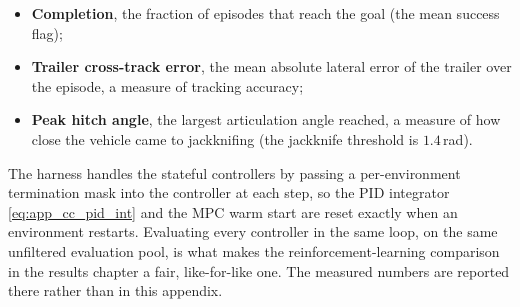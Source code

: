 \begin{itemize}
    \item \textbf{Completion}, the fraction of episodes that reach the goal
    (the mean success flag);
    \item \textbf{Trailer cross-track error}, the mean absolute lateral error of the
    trailer over the episode, a measure of tracking accuracy;
    \item \textbf{Peak hitch angle}, the largest articulation angle reached, a measure
    of how close the vehicle came to jackknifing (the jackknife threshold is
    $1.4$\,rad).
\end{itemize}

The harness handles the stateful controllers by passing a per-environment termination mask
into the controller at each step, so the PID integrator \eqref{eq:app_cc_pid_int} and the
MPC warm start are reset exactly when an environment restarts. Evaluating every controller
in the same loop, on the same unfiltered evaluation pool, is what makes the reinforcement-learning
comparison in the results chapter a fair, like-for-like one. The measured numbers are
reported there rather than in this appendix.
